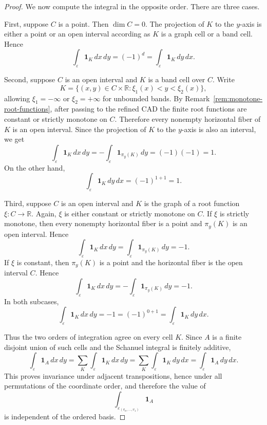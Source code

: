 \documentclass[11pt]{article}
\theoremstyle{remark}
\newcommand{\1}{\mathbf 1}
\begin{document}
\begin{proof}
We now compute the integral in the opposite order.  There are three cases.

First, suppose \(C\) is a point.  Then \(\dim C=0\).  The projection of \(K\)
to the \(y\)-axis is either a point or an open interval according as \(K\) is a
graph cell or a band cell.  Hence
\[
  \int_{\varepsilon}\mathbf{1}_K\,dx\,dy
  =
  (-1)^d
  =
  \int_{\varepsilon}\mathbf{1}_K\,dy\,dx .
\]

Second, suppose \(C\) is an open interval and \(K\) is a band cell over \(C\).
Write
\[
  K=\{(x,y)\in C\times\mathbb{R}:\xi_1(x)<y<\xi_2(x)\},
\]
allowing \(\xi_1=-\infty\) or \(\xi_2=+\infty\) for unbounded bands.  By
Remark~\ref{rem:monotone-root-functions}, after passing to the refined CAD the
finite root functions are constant or strictly monotone on \(C\).  Therefore
every nonempty horizontal fiber of \(K\) is an open interval.  Since the
projection of \(K\) to the \(y\)-axis is also an interval, we get
\[
  \int_{\varepsilon}\mathbf{1}_K\,dx\,dy
  =
  -\int_{\varepsilon}\mathbf{1}_{\pi_y(K)}\,dy
  =
  (-1)(-1)
  =
  1.
\]
On the other hand,
\[
  \int_{\varepsilon}\mathbf{1}_K\,dy\,dx
  =
  (-1)^{1+1}
  =
  1.
\]

Third, suppose \(C\) is an open interval and \(K\) is the graph of a root
function \(\xi:C\to\mathbb{R}\).  Again, \(\xi\) is either constant or strictly
monotone on \(C\).  If \(\xi\) is strictly monotone, then every nonempty
horizontal fiber is a point and \(\pi_y(K)\) is an open interval.  Hence
\[
  \int_{\varepsilon}\mathbf{1}_K\,dx\,dy
  =
  \int_{\varepsilon}\mathbf{1}_{\pi_y(K)}\,dy
  =
  -1.
\]
If \(\xi\) is constant, then \(\pi_y(K)\) is a point and the horizontal fiber is
the open interval \(C\).  Hence
\[
  \int_{\varepsilon}\mathbf{1}_K\,dx\,dy
  =
  -\int_{\varepsilon}\mathbf{1}_{\pi_y(K)}\,dy
  =
  -1.
\]
In both subcases,
\[
  \int_{\varepsilon}\mathbf{1}_K\,dx\,dy
  =
  -1
  =
  (-1)^{0+1}
  =
  \int_{\varepsilon}\mathbf{1}_K\,dy\,dx .
\]

Thus the two orders of integration agree on every cell \(K\).  Since \(A\) is a
finite disjoint union of such cells and the Schanuel integral is finitely
additive,
\[
  \int_{\varepsilon}\mathbf{1}_A\,dx\,dy
  =
  \sum_K
  \int_{\varepsilon}\mathbf{1}_K\,dx\,dy
  =
  \sum_K
  \int_{\varepsilon}\mathbf{1}_K\,dy\,dx
  =
  \int_{\varepsilon}\mathbf{1}_A\,dy\,dx .
\]
This proves invariance under adjacent transpositions, hence under all
permutations of the coordinate order, and therefore the value of
\[
  \int_{\varepsilon_{(v_n,\ldots,v_1)}} \mathbf{1}_A
\]
is independent of the ordered basis.
\end{proof}
\end{document}
